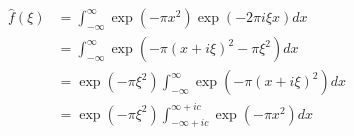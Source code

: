 \begin{align}
\hat{f}(\xi) & = \int_{-\infty}^{\infty} \exp(- \pi x^2) \exp(-2 \pi i \xi x) dx\\
& = \int_{-\infty}^{\infty} \exp(-\pi(x+i \xi)^2 - \pi \xi^2) dx\\
& = \exp( - \pi \xi^2)\int_{-\infty}^{\infty} \exp(-\pi(x+i \xi)^2) dx\\
& = \exp( - \pi \xi^2)\int_{-\infty + ic}^{\infty+ic} \exp(-\pi x^2) dx
\end{align}